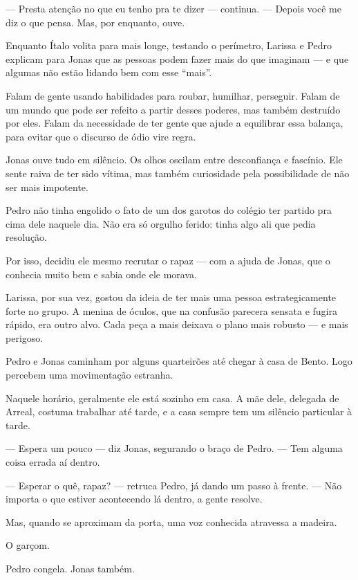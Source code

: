 — Presta atenção no que eu tenho pra te dizer — continua. — Depois você me diz o que pensa.  
Mas, por enquanto, ouve.

Enquanto Ítalo volita para mais longe, testando o perímetro, Larissa e Pedro explicam para Jonas que as pessoas podem fazer mais do que imaginam — e que algumas não estão lidando bem com esse “mais”.

Falam de gente usando habilidades para roubar, humilhar, perseguir.  
Falam de um mundo que pode ser refeito a partir desses poderes, mas também destruído por eles.  
Falam da necessidade de ter gente que ajude a equilibrar essa balança, para evitar que o discurso de ódio vire regra.

Jonas ouve tudo em silêncio.  
Os olhos oscilam entre desconfiança e fascínio.  
Ele sente raiva de ter sido vítima, mas também curiosidade pela possibilidade de não ser mais impotente.

\bigskip

Pedro não tinha engolido o fato de um dos garotos do colégio ter partido pra cima dele naquele dia.  
Não era só orgulho ferido: tinha algo ali que pedia resolução.

Por isso, decidiu ele mesmo recrutar o rapaz — com a ajuda de Jonas, que o conhecia muito bem e sabia onde ele morava.

Larissa, por sua vez, gostou da ideia de ter mais uma pessoa estrategicamente forte no grupo.  
A menina de óculos, que na confusão parecera sensata e fugira rápido, era outro alvo.  
Cada peça a mais deixava o plano mais robusto — e mais perigoso.

\bigskip

Pedro e Jonas caminham por alguns quarteirões até chegar à casa de Bento.  
Logo percebem uma movimentação estranha.

Naquele horário, geralmente ele está sozinho em casa.  
A mãe dele, delegada de Arreal, costuma trabalhar até tarde, e a casa sempre tem um silêncio particular à tarde.

— Espera um pouco — diz Jonas, segurando o braço de Pedro. — Tem alguma coisa errada aí dentro.

— Esperar o quê, rapaz? — retruca Pedro, já dando um passo à frente. — Não importa o que estiver acontecendo lá dentro, a gente resolve.

Mas, quando se aproximam da porta, uma voz conhecida atravessa a madeira.

O garçom.

Pedro congela.  
Jonas também.

